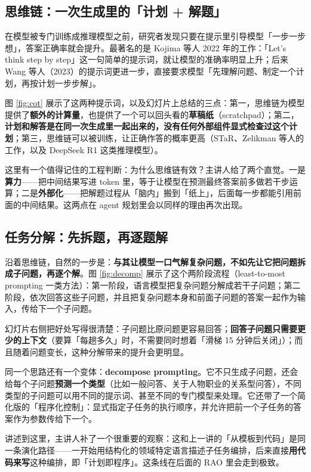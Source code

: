 \documentclass[a4paper]{article}
\begin{document}
\subsection{思维链：一次生成里的「计划 + 解题」}

在模型被专门训练成推理模型之前，研究者发现只要在提示里引导模型「一步一步想」，答案正确率就会提升。最著名的是 Kojima 等人 2022 年的工作：「Let's think step by step」这一句简单的提示词，就让模型的准确率明显上升；后来 Wang 等人（2023）的提示词更进一步，直接要求模型「先理解问题、制定一个计划，再按计划一步步解」。

图 \ref{fig:cot} 展示了这两种提示词，以及幻灯片上总结的三点：第一，思维链为模型提供了\textbf{额外的计算量}，也提供了一个可以回头看的\textbf{草稿纸}（scratchpad）；第二，\textbf{计划和解答是在同一次生成里一起出来的，没有任何外部组件显式检查过这个计划}；第三，思维链可以被训练，让正确作答的概率更高（STaR、Zelikman 等人的工作，以及 DeepSeek R1 这类推理模型）。

这里有一个值得记住的工程判断：为什么思维链有效？主讲人给了两个直觉。一是\textbf{算力}——把中间结果写进 token 里，等于让模型在预测最终答案前多做若干步运算；二是\textbf{外部化}——把解题过程从「脑内」搬到「纸上」，后面每一步都能引用前面的中间结果。这两点在 agent 规划里会以同样的理由再次出现。

\subsection{任务分解：先拆题，再逐题解}

沿着思维链，自然的一步是：\textbf{与其让模型一口气解复杂问题，不如先让它把问题拆成子问题，再逐个解}。图 \ref{fig:decomp} 展示了这个两阶段流程（least-to-most prompting 一类方法）：第一阶段，语言模型把复杂问题分解成若干子问题；第二阶段，依次回答这些子问题，并且把复杂问题本身和前面子问题的答案一起作为输入，传给下一个子问题。

幻灯片右侧把好处写得很清楚：子问题比原问题更容易回答；\textbf{回答子问题只需要更少的上下文}（要算「每趟多久」时，不需要同时想着「滑梯 15 分钟后关闭」）；而且随着问题变长，这种分解带来的提升会更明显。

同一个思路还有一个变体：\textbf{decompose prompting}。它不只生成子问题，还会给每个子问题\textbf{预测一个类型}（比如一般问答、关于人物职业的关系型问答），不同类型的子问题可以用不同的提示词、甚至不同的专门模型来处理。它还带了一个简化版的「程序化控制」：显式指定子任务的执行顺序，并允许把前一个子任务的答案作为参数传给下一个。

讲述到这里，主讲人补了一个很重要的观察：这和上一讲的「从模板到代码」是同一条演化路径——一开始用结构化的领域特定语言描述子任务编排，后来直接\textbf{用代码来写}这种编排，即「计划即程序」。这条线在后面的 RAO 里会走到极致。
\end{document}
